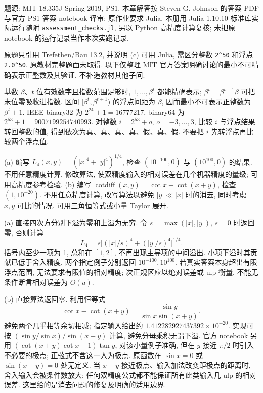\label{ass:ps1}
题源: MIT 18.335J Spring 2019, PS1. 本章解答按 Steven G. Johnson 的答案 PDF 与官方 PS1 答案 notebook 译审; 原作业要求 Julia, 本册用 Julia 1.10.10 标准库实际运行随附 \texttt{assessment\_checks.jl}, 另以 Python 高精度计算复核; 未把原 notebook 的运行记录当作本次实跑记录.
\begin{exercise}\label{ps1:q1}
原题只引用 Trefethen/Bau 13.2, 并说明 (c) 可用 Julia, 需区分整数 \texttt{2\^{}50} 和浮点 \texttt{2.0\^{}50}. 原教材完整题面未取得. 以下仅整理 MIT 官方答案明确讨论的最小不可精确表示正整数及其验证, 不补造教材其他子问.
\end{exercise}
\begin{solution}
基数 $\beta$、$t$ 位有效数字且指数范围足够时, $1,\ldots,\beta^t$ 都能精确表示; $\beta^t=\beta^{t-1}\beta$ 可把末位零吸收进指数. 区间 $[\beta^t,\beta^{t+1})$ 的浮点间距为 $\beta$, 因而最小不可表示正整数为 $\beta^t+1$. IEEE binary32 为 $2^{24}+1=16777217$, binary64 为 $2^{53}+1=9007199254740993$. 对整数 $i=2^{53}+o$, $o=-3,\ldots,3$, 比较 $i$ 与浮点结果转回整数的值, 得到依次为真、真、真、真、假、真、假. 不要把 $i$ 先转浮点再比较两个浮点值.
\end{solution}
\begin{exercise}\label{ps1:q2}
(a) 编写 $L_4(x,y)=(|x|^4+|y|^4)^{1/4}$, 检查 $(10^{-100},0)$ 与 $(10^{100},0)$ 的结果. 不用任意精度计算, 修改算法, 使双精度输入的相对误差在几个机器精度的量级; 可用高精度参考检验.
(b) 编写 $\operatorname{cotdiff}(x,y)=\cot x-\cot(x+y)$, 检查 $(1,10^{-20})$. 不用任意精度计算, 改写算法以避免 $|y|\ll|x|$ 时的消去, 同时考虑 $x,y$ 可比的情况. 可用三角恒等式或小量 Taylor 展开.
\end{exercise}
\begin{solution}
(a) 直接四次方分别下溢为零和上溢为无穷. 令 $s=\max(|x|,|y|)$, $s=0$ 时返回零, 否则计算
\[
 L_4=s\bigl[(|x|/s)^4+(|y|/s)^4\bigr]^{1/4}.
\]
括号内至少一项为 1, 总和在 $[1,2]$, 不再出现主导项的中间溢出. 小项下溢时其贡献已低于舍入精度. 两个指定例子分别返回 $10^{-100},10^{100}$. 若真实答案本身超出有限浮点范围, 无法要求有限值的相对精度; 次正规区应以绝对误差或 ulp 衡量, 不能无条件断言相对误差为 $O(u)$.

(b) 直接算法返回零. 利用恒等式
\[
 \cot x-\cot(x+y)=\frac{\sin y}{\sin x\sin(x+y)}.
\]
避免两个几乎相等余切相减; 指定输入给出约 $1.412282927437392\times10^{-20}$. 实现可按 $(\sin y/\sin x)/\sin(x+y)$ 计算, 避免分母乘积无谓下溢. 官方 notebook 另用 $(\cot(x+y)\cot x+1)\tan y$, 对该小量例子准确, 但在 $y$ 接近 $\pi/2$ 时引入不必要的极点; 正弦式不含这一人为极点. 原函数在 $\sin x=0$ 或 $\sin(x+y)=0$ 处无定义. 当 $x+y$ 接近极点、输入加法改变距极点的距离时, 舍入输入会被条件数放大; 任何双精度公式都不能保证所有此类输入几 ulp 的相对误差. 这里给的是消去问题的修复及明确的适用边界.
\end{solution}
